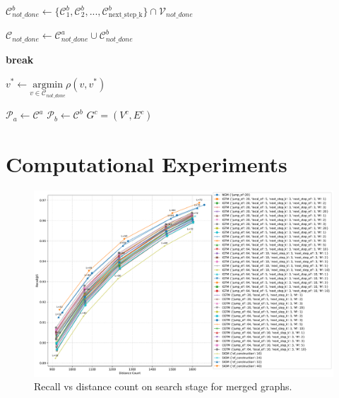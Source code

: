 \documentclass{article}
\begin{document}
\begin{algorithm}
\begin{algorithmic}[1]
        \State $\mathcal{C}^b_{not\_done} \gets \{\mathcal{C}^b_1, \mathcal{C}^b_2, ..., \mathcal{C}^b_{ \text{next\_step\_k} } \}  \cap \mathcal{V}_{not\_done}$
        
        
        \State $\mathcal{C}_{not\_done} \gets \mathcal{C}^a_{not\_done} \cup \mathcal{C}^b_{not\_done}$
        
            \State \textbf{break}
        \EndIf
        
        \State $v^* \gets \underset{v \in \mathcal{C}_{not\_done}}{\mathrm{argmin}} \rho(v, v^*)$
        
        \State $\mathcal{P}_a \gets \mathcal{C}^a$
        \State $\mathcal{P}_b \gets \mathcal{C}^b$
    \EndWhile
\EndWhile
\State \Return $G^c=(V^c,E^c)$
\end{algorithmic}
\end{algorithm}

\section{Computational Experiments}
\label{sec:experimens}

\begin{figure}
  \centering
  \includegraphics[width=1.\linewidth]{figs/recall_vs_distance_count.pdf}
  \caption{Recall vs distance count on search stage for merged graphs. }
\label{fig:search}
\end{figure}


\end{document}
